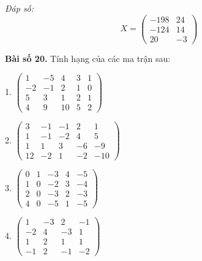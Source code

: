         \textit{Đáp số:}
        \[
        X = \begin{pmatrix}
        -198 & 24 \\
        -124 & 14 \\
        20 & -3
        \end{pmatrix}
        \]
        
        \textbf{Bài số 20.} Tính hạng của các ma trận sau:
        
        1.
        \(
        \begin{pmatrix}
        1 & -5 & 4 & 3 & 1 \\
        -2 & -1 & 2 & 1 & 0 \\
        5 & 3 & 1 & 2 & 1 \\
        4 & 9 & 10 & 5 & 2
        \end{pmatrix}
        \)\\
        \vspace*{0.5cm}

        
        2.
        \(
        \begin{pmatrix}
        3 & -1 & -1 & 2 & 1 \\
        1 & -1 & -2 & 4 & 5 \\
        1 & 1 & 3 & -6 & -9 \\
        12 & -2 & 1 & -2 & -10
        \end{pmatrix}
        \)\\
        \vspace*{0.5cm}

        
        3.
        \(
        \begin{pmatrix}
        0 & 1 & -3 & 4 & -5 \\
        1 & 0 & -2 & 3 & -4 \\
        2 & 0 & -3 & 2 & -3 \\
        4 & 0 & -5 & 1 & -5
        \end{pmatrix}
        \)\\
        \vspace*{0.5cm}

        4.
        \(
        \begin{pmatrix}
        1 & -3 & 2 & -1 \\
        -2 & 4 & -3 & 1 \\
        1 & 2 & 1 & 1 \\
        -1 & 2 & -1 & -2
        \end{pmatrix}
        \)\\
        \vspace*{0.5cm}

